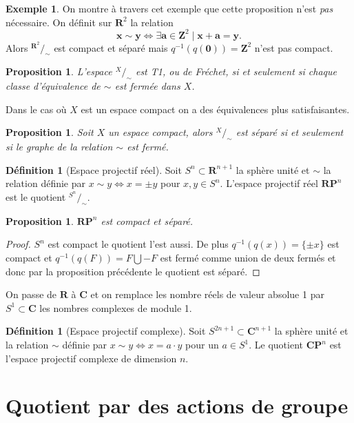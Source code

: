 \documentclass[12pt]{book}
\newtheorem{prop}[lemma]{Proposition}
\theoremstyle{definition}
\newtheorem{definition}[lemma]{Définition}
\newtheorem{example}[lemma]{Exemple}
\theoremstyle{remark}
\newcommand*\quot[2]{{^{\textstyle #1}\big/_{\textstyle #2}}}
\begin{document}
	\begin{example} On montre à travers cet exemple que cette proposition n'est \emph{pas} nécessaire. On définit sur $\mathbf{R}^2$ la relation  \[
		\textbf{x} \sim \textbf{y} \iff \exists \textbf{a} \in \mathbf{Z}^2 \;|\; \textbf{x} + \textbf{a} = \textbf{y}
	.\] Alors $\quot{\mathbf{R}^2}{\sim}$ est compact et séparé mais $q^{-1}(q(\textbf{0})) = \mathbf{Z}^2$ n'est pas compact.
	\end{example}

	\begin{prop}
		L'espace $\quot{X}{\sim}$ est T1, ou de Fréchet, si et seulement si chaque classe d'équivalence de $\sim$ est fermée dans $X$.
	\end{prop}
	
	Dans le cas où $X$ est un espace compact on a des équivalences plus satisfaisantes.
	 \begin{prop}
		Soit $X$ un espace compact, alors $\quot{X}{\sim}$ est séparé si et seulement si le graphe de la relation $\sim$ est fermé.
	\end{prop}

	\begin{definition}[Espace projectif réel]
		Soit $S^n \subset \mathbf{R}^{n+1}$ la sphère unité et $\sim$ la relation définie par $x \sim y \iff x = \pm y$ pour $x,y \in S^n$. L'espace projectif réel $\mathbf{RP}^n$ est le quotient  $\quot{S^n}{\sim}$.
	\end{definition}
	\begin{prop}
		$\mathbf{RP}^n$ est compact et séparé.
	\end{prop}
	\begin{proof}
		$S^n$ est compact le quotient l'est aussi. De plus $q^{-1}(q(x)) = \{\pm x\}$ est compact et $q^{-1}(q(F)) = F \bigcup -F$ est fermé comme union de deux fermés et donc par la proposition précédente le quotient est séparé.
	\end{proof}
	On passe de $\mathbf{R}$ à  $\mathbf{C}$ et on remplace les nombre réels de valeur absolue 1 par  $S^1 \subset \mathbf{C}$ les nombres complexes de module 1.

	\begin{definition}[Espace projectif complexe]
		Soit $S^{2n+1} \subset \mathbf{C}^{n+1}$ la sphère unité et la relation $\sim$ définie par  $x \sim y  \iff x = a\cdot y$ pour un $a \in S^1$. Le quotient $\mathbf{CP}^n$ est l'espace projectif complexe de dimension  $n$.
	\end{definition}

	\section{Quotient par des actions de groupe}
\end{document}
